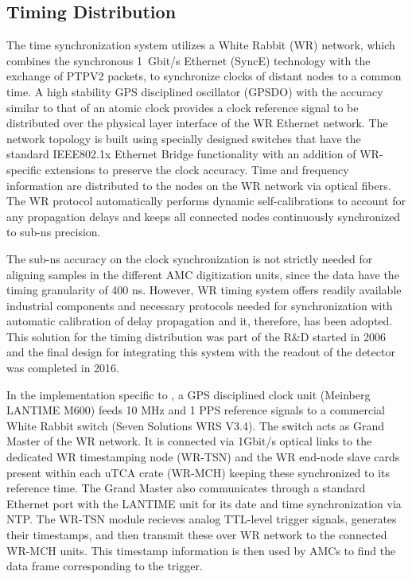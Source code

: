 \subsection{Timing Distribution}
\label{sec:fddp-tpc-elec-wr}
The time synchronization system utilizes a White Rabbit (WR) network, which combines the synchronous \SI{1}{Gbit/s} Ethernet (SyncE) technology with the exchange of PTPV2 packets, to synchronize clocks of distant nodes to a common time. A high stability GPS disciplined oscillator (GPSDO) with the accuracy similar to that of an atomic clock provides a clock reference signal to be distributed over the physical layer interface of the WR Ethernet network. The network topology is built using specially designed switches that have the standard IEEE802.1x Ethernet Bridge functionality with an addition of WR-specific extensions to preserve the clock accuracy. Time and frequency information are distributed to the nodes on the WR network via optical fibers. The WR protocol automatically performs dynamic self-calibrations to account for any propagation delays and keeps all connected nodes continuously synchronized to sub-ns precision. 

The sub-ns accuracy on the clock synchronization is not strictly needed for aligning samples in the different AMC digitization units, since the data have the timing granularity of 400 ns. However, WR timing system offers readily available industrial components and necessary protocols needed for synchronization with automatic calibration of delay propagation and it, therefore, has been adopted. This solution for the timing distribution was part of the R\&D started in 2006 and the final design for integrating this system with the readout of the  detector was completed in 2016.

In the implementation specific to , a GPS disciplined clock unit (Meinberg LANTIME M600) feeds 10 MHz and 1 PPS reference signals to a commercial White Rabbit switch (Seven Solutions WRS V3.4). The switch acts as Grand Master of the WR network. It is connected via 1Gbit/s optical links to the dedicated WR timestamping node (WR-TSN) and the WR end-node slave cards present within each uTCA crate (WR-MCH) keeping these synchronized to its reference time. The Grand Master also communicates through a standard Ethernet port with the LANTIME unit for its date and time synchronization via NTP. The WR-TSN module recieves analog TTL-level trigger signals, generates their timestamps, and then transmit these over WR network to the connected WR-MCH units. This timestamp information is then used by AMCs to find the data frame corresponding to the trigger. 


